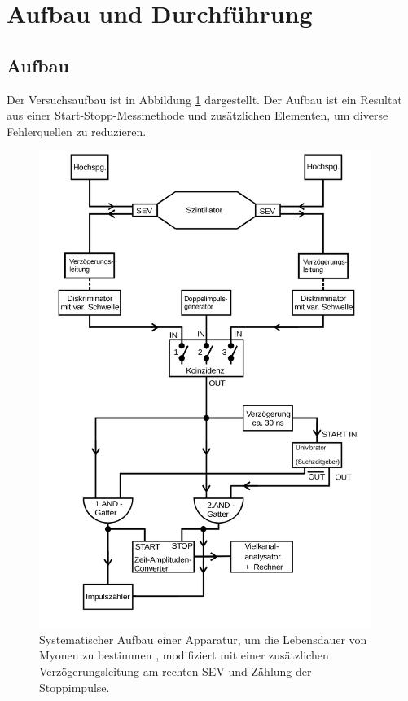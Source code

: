 \section{Aufbau und Durchführung}
\subsection{Aufbau}
\label{sec:Aufbau}

Der Versuchsaufbau ist in Abbildung \ref{fig:aufbau1} dargestellt.
Der Aufbau ist ein Resultat aus einer Start-Stopp-Messmethode und zusätzlichen Elementen, um diverse Fehlerquellen zu reduzieren.\\

\begin{figure}
  \centering
  \includegraphics[height=15.5cm]{ressources/aufbau.jpeg}
  \caption{Systematischer Aufbau einer Apparatur, um die Lebensdauer von Myonen zu bestimmen \cite{skript}, modifiziert mit einer zusätzlichen Verzögerungsleitung am rechten SEV und Zählung der Stoppimpulse.}
  \label{fig:aufbau1}
\end{figure}



